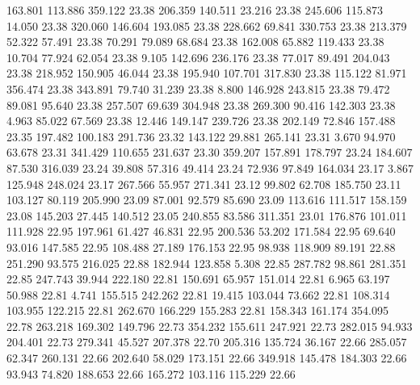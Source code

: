  163.801  113.886  359.122        23.38
 206.359  140.511   23.216        23.38
 245.606  115.873   14.050        23.38
 320.060  146.604  193.085        23.38
 228.662   69.841  330.753        23.38
 213.379   52.322   57.491        23.38
  70.291   79.089   68.684        23.38
 162.008   65.882  119.433        23.38
  10.704   77.924   62.054        23.38
   9.105  142.696  236.176        23.38
  77.017   89.491  204.043        23.38
 218.952  150.905   46.044        23.38
 195.940  107.701  317.830        23.38
 115.122   81.971  356.474        23.38
 343.891   79.740   31.239        23.38
   8.800  146.928  243.815        23.38
  79.472   89.081   95.640        23.38
 257.507   69.639  304.948        23.38
 269.300   90.416  142.303        23.38
   4.963   85.022   67.569        23.38
  12.446  149.147  239.726        23.38
 202.149   72.846  157.488        23.35
 197.482  100.183  291.736        23.32
 143.122   29.881  265.141        23.31
   3.670   94.970   63.678        23.31
 341.429  110.655  231.637        23.30
 359.207  157.891  178.797        23.24
 184.607   87.530  316.039        23.24
  39.808   57.316   49.414        23.24
  72.936   97.849  164.034        23.17
   3.867  125.948  248.024        23.17
 267.566   55.957  271.341        23.12
  99.802   62.708  185.750        23.11
 103.127   80.119  205.990        23.09
  87.001   92.579   85.690        23.09
 113.616  111.517  158.159        23.08
 145.203   27.445  140.512        23.05
 240.855   83.586  311.351        23.01
 176.876  101.011  111.928        22.95
 197.961   61.427   46.831        22.95
 200.536   53.202  171.584        22.95
  69.640   93.016  147.585        22.95
 108.488   27.189  176.153        22.95
  98.938  118.909   89.191        22.88
 251.290   93.575  216.025        22.88
 182.944  123.858    5.308        22.85
 287.782   98.861  281.351        22.85
 247.743   39.944  222.180        22.81
 150.691   65.957  151.014        22.81
   6.965   63.197   50.988        22.81
   4.741  155.515  242.262        22.81
  19.415  103.044   73.662        22.81
 108.314  103.955  122.215        22.81
 262.670  166.229  155.283        22.81
 158.343  161.174  354.095        22.78
 263.218  169.302  149.796        22.73
 354.232  155.611  247.921        22.73
 282.015   94.933  204.401        22.73
 279.341   45.527  207.378        22.70
 205.316  135.724   36.167        22.66
 285.057   62.347  260.131        22.66
 202.640   58.029  173.151        22.66
 349.918  145.478  184.303        22.66
  93.943   74.820  188.653        22.66
 165.272  103.116  115.229        22.66
